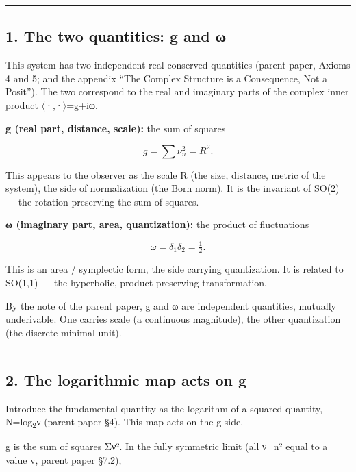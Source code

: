 \documentclass[11pt]{ltjsarticle}
\begin{document}
\begin{center}\rule{0.5\linewidth}{0.5pt}\end{center}

\subsection{1. The two quantities: g and
ω}\label{the-two-quantities-g-and-ux3c9}

This system has two independent real conserved quantities (parent paper,
Axioms 4 and 5; and the appendix ``The Complex Structure is a
Consequence, Not a Posit''). The two correspond to the real and
imaginary parts of the complex inner product $\langle$·,·$\rangle$=g+iω.

\textbf{g (real part, distance, scale):} the sum of squares

\[g = \sum \nu_n^2 = R^2.\]

This appears to the observer as the scale R (the size, distance, metric
of the system), the side of normalization (the Born norm). It is the
invariant of SO(2) --- the rotation preserving the sum of squares.

\textbf{ω (imaginary part, area, quantization):} the product of
fluctuations

\[\omega = \delta_1\delta_2 = \tfrac{1}{2}.\]

This is an area / symplectic form, the side carrying quantization. It is
related to SO(1,1) --- the hyperbolic, product-preserving
transformation.

By the note of the parent paper, g and ω are independent quantities,
mutually underivable. One carries scale (a continuous magnitude), the
other quantization (the discrete minimal unit).

\begin{center}\rule{0.5\linewidth}{0.5pt}\end{center}

\subsection{2. The logarithmic map acts on
g}\label{the-logarithmic-map-acts-on-g}

Introduce the fundamental quantity as the logarithm of a squared
quantity, N=log\textsubscript{2}ν (parent paper §4). This map acts on the g side.

g is the sum of squares Σν². In the fully symmetric limit (all ν\_n²
equal to a value v, parent paper §7.2),
\end{document}
